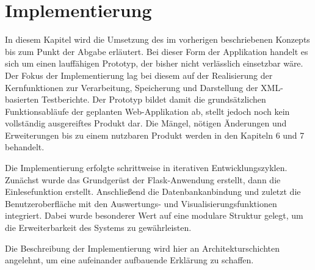 \newpage
\section{Implementierung}
\label{sec:implementierung}


In diesem Kapitel wird die Umsetzung des im vorherigen beschriebenen Konzepts bis zum Punkt der Abgabe erläutert.
Bei dieser Form der Applikation handelt es sich um einen lauffähigen Prototyp, der bisher nicht verlässlich einsetzbar wäre.
Der Fokus der Implementierung lag bei diesem auf der Realisierung der Kernfunktionen zur Verarbeitung, Speicherung und Darstellung der XML-basierten Testberichte.
Der Prototyp bildet damit die grundsätzlichen Funktionsabläufe der geplanten Web-Applikation ab, stellt jedoch noch kein vollständig ausgereiftes Produkt dar.
Die Mängel, nötigen Änderungen und Erweiterungen bis zu einem nutzbaren Produkt werden in den Kapiteln 6 und 7 behandelt.

Die Implementierung erfolgte schrittweise in iterativen Entwicklungszyklen.
Zunächst wurde das Grundgerüst der Flask-Anwendung erstellt, dann die Einlesefunktion erstellt.
Anschließend die Datenbankanbindung und zuletzt die Benutzeroberfläche mit den Auswertungs- und Visualisierungsfunktionen integriert.
Dabei wurde besonderer Wert auf eine modulare Struktur gelegt, um die Erweiterbarkeit des Systems zu gewährleisten.

Die Beschreibung der Implementierung wird hier an Architekturschichten angelehnt, um eine aufeinander aufbauende Erklärung zu schaffen.






